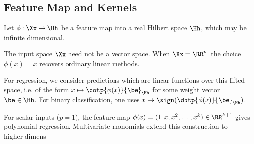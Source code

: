                                                   
\subsection{Feature Map and Kernels}

Let $\phi : \Xx \rightarrow \Hh$ be a feature map into a real Hilbert space $\Hh$, which may be infinite dimensional.
 
The input space $\Xx$ need not be a vector space. When $\Xx=\RR^p$, the choice $\phi(x)=x$ recovers ordinary linear methods.
 
For regression, we consider predictions which are linear functions over this lifted space, i.e. of the form $x \mapsto \dotp{\phi(x)}{\be}_\Hh$ for some weight vector $\be \in \Hh$. For binary classification, one uses $x \mapsto \sign(\dotp{\phi(x)}{\be}_\Hh)$.

For scalar inputs ($p=1$), the feature map $\phi(x) = (1,x,x^2,\ldots,x^k)\in\RR^{k+1}$ gives polynomial regression. Multivariate monomials extend this construction to higher-dimens